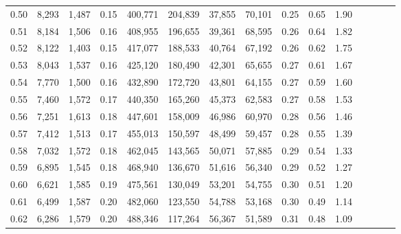 \begin{tabular}{rrrcrrrrrrrrrrr}
0.50 &   8,293 &  1,487 &                                       0.15 &  400,771 &  204,839 &   37,855 &   70,101 &  0.25 &  0.65 &                         1.90 \\
0.51 &   8,184 &  1,506 &                                       0.16 &  408,955 &  196,655 &   39,361 &   68,595 &  0.26 &  0.64 &                         1.82 \\
0.52 &   8,122 &  1,403 &                                       0.15 &  417,077 &  188,533 &   40,764 &   67,192 &  0.26 &  0.62 &                         1.75 \\
0.53 &   8,043 &  1,537 &                                       0.16 &  425,120 &  180,490 &   42,301 &   65,655 &  0.27 &  0.61 &                         1.67 \\
0.54 &   7,770 &  1,500 &                                       0.16 &  432,890 &  172,720 &   43,801 &   64,155 &  0.27 &  0.59 &                         1.60 \\
0.55 &   7,460 &  1,572 &                                       0.17 &  440,350 &  165,260 &   45,373 &   62,583 &  0.27 &  0.58 &                         1.53 \\
0.56 &   7,251 &  1,613 &                                       0.18 &  447,601 &  158,009 &   46,986 &   60,970 &  0.28 &  0.56 &                         1.46 \\
0.57 &   7,412 &  1,513 &                                       0.17 &  455,013 &  150,597 &   48,499 &   59,457 &  0.28 &  0.55 &                         1.39 \\
0.58 &   7,032 &  1,572 &                                       0.18 &  462,045 &  143,565 &   50,071 &   57,885 &  0.29 &  0.54 &                         1.33 \\
0.59 &   6,895 &  1,545 &                                       0.18 &  468,940 &  136,670 &   51,616 &   56,340 &  0.29 &  0.52 &                         1.27 \\
0.60 &   6,621 &  1,585 &                                       0.19 &  475,561 &  130,049 &   53,201 &   54,755 &  0.30 &  0.51 &                         1.20 \\
0.61 &   6,499 &  1,587 &                                       0.20 &  482,060 &  123,550 &   54,788 &   53,168 &  0.30 &  0.49 &                         1.14 \\
0.62 &   6,286 &  1,579 &                                       0.20 &  488,346 &  117,264 &   56,367 &   51,589 &  0.31 &  0.48 &                         1.09 \\

\end{tabular}
